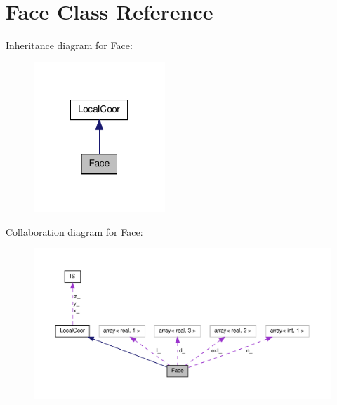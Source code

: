 \hypertarget{classFace}{\section{Face Class Reference}
\label{classFace}
}


Inheritance diagram for Face\-:\nopagebreak
\begin{figure}[H]
\begin{center}
\leavevmode
\includegraphics[width=140pt]{classFace__inherit__graph}
\end{center}
\end{figure}


Collaboration diagram for Face\-:\nopagebreak
\begin{figure}[H]
\begin{center}
\leavevmode
\includegraphics[width=350pt]{classFace__coll__graph}
\end{center}
\end{figure}
